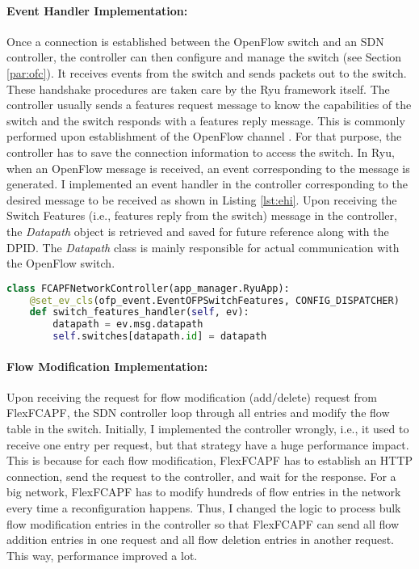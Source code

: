 \paragraph{Event Handler Implementation:}
Once a connection is established between the OpenFlow switch and an SDN controller, the controller can then configure and manage the switch (see Section \ref{par:ofc}). It receives events from the switch and sends packets out to the switch. These handshake procedures are taken care by the Ryu framework itself. The controller usually sends a features request message to know the capabilities of the switch and the switch responds with a features reply message. This is commonly performed upon establishment of the OpenFlow channel \cite{ryubook}. For that purpose, the controller has to save the connection information to access the switch. In Ryu, when an OpenFlow message is received, an event corresponding to the message is generated. I implemented an event handler in the controller corresponding to the desired message to be received as shown in Listing \ref{lst:ehi}. Upon receiving the Switch Features (i.e., features reply from the switch) message in the controller, the \textit{Datapath} object is retrieved and saved for future reference along with the DPID. The \textit{Datapath} class is mainly responsible for actual communication with the OpenFlow switch.


\begin{lstlisting}[caption={Event handler implementation},label={lst:ehi},language=Python,tabsize=2,basicstyle=\footnotesize,breaklines=true, showspaces=false,showstringspaces=false,showtabs=false,frame=single]
class FCAPFNetworkController(app_manager.RyuApp):
	@set_ev_cls(ofp_event.EventOFPSwitchFeatures, CONFIG_DISPATCHER)
	def switch_features_handler(self, ev):
		datapath = ev.msg.datapath
		self.switches[datapath.id] = datapath
\end{lstlisting}

\paragraph{Flow Modification Implementation:}
Upon receiving the request for flow modification (add/delete) request from FlexFCAPF, the SDN controller loop through all entries and modify the flow table in the switch. Initially, I implemented the controller wrongly, i.e., it used to receive one entry per request, but that strategy have a huge performance impact. This is because for each flow modification, FlexFCAPF has to establish an HTTP connection, send the request to the controller, and wait for the response. For a big network, FlexFCAPF has to modify hundreds of flow entries in the network every time a reconfiguration happens. Thus, I changed the logic to process bulk flow modification entries in the controller so that FlexFCAPF can send all flow addition entries in one request and all flow deletion entries in another request. This way, performance improved a lot.

